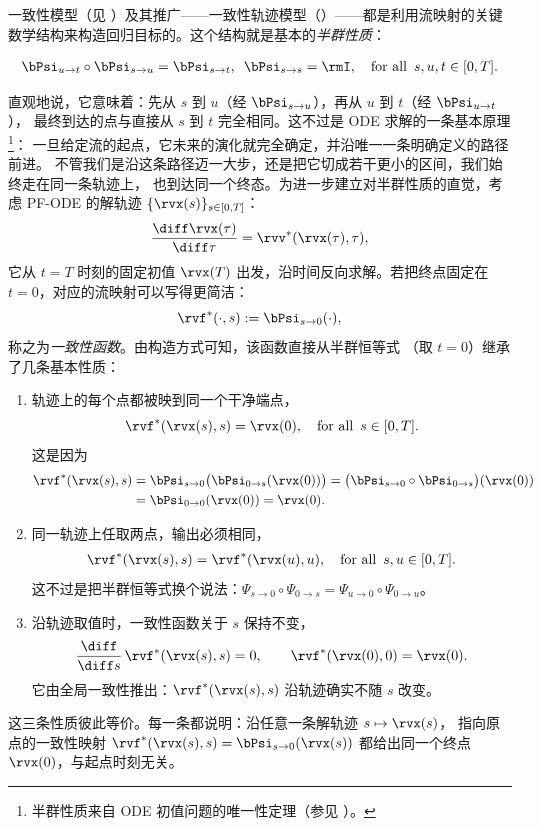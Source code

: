 一致性模型（见 ）及其推广——一致性轨迹模型（）——都是利用流映射的关键数学结构来构造回归目标的。这个结构就是基本的\emph{半群性质}：
\begin{mdframed}
   \begin{align}\label{eq:semi-group}
       \bPsi_{u\to t}\circ \bPsi_{s\to u}=\bPsi_{s\to t},
       \,\,\,
       \bPsi_{s\to s}=\rmI, \quad \text{for all }\, s, u, t \in [0,T].
   \end{align}
\end{mdframed}
直观地说，它意味着：先从 $s$ 到 $u$（经 $\bPsi_{s\rightarrow u}$），再从 $u$ 到 $t$（经 $\bPsi_{u\rightarrow t}$），
最终到达的点与直接从 $s$ 到 $t$ 完全相同。这不过是 ODE 求解的一条基本原理\footnote{半群性质来自 ODE 初值问题的唯一性定理（参见 ）。}：
一旦给定流的起点，它未来的演化就完全确定，并沿唯一一条明确定义的路径前进。
不管我们是沿这条路径迈一大步，还是把它切成若干更小的区间，我们始终走在同一条轨迹上，
也到达同一个终态。为进一步建立对半群性质的直觉，考虑 PF-ODE 的解轨迹 $\{\rvx(s)\}_{s \in [0,T]}$：
\begin{align*}
    \frac{\diff \rvx(\tau)}{\diff \tau} = \rvv^*(\rvx(\tau), \tau),
\end{align*}
它从 $t=T$ 时刻的固定初值 $\rvx(T)$ 出发，沿时间反向求解。若把终点固定在 $t=0$，对应的流映射可以写得更简洁：
\[
\rvf^*(\cdot, s) := \bPsi_{s\to 0}(\cdot),
\]
称之为\emph{一致性函数}。由构造方式可知，该函数直接从半群恒等式 （取 $t=0$）继承了几条基本性质：\begin{enumerate}
    \item[(i)]  轨迹上的每个点都被映到同一个干净端点，
    \[
       \rvf^*(\rvx(s), s) = \rvx(0), \quad \text{for all }\, s \in [0,T].
    \]
    这是因为
\begin{align*}
\rvf^*(\rvx(s),s)
&= \bPsi_{s\to 0}\big(\bPsi_{0\to s}(\rvx(0))\big)
= \big(\bPsi_{s\to 0}\circ \bPsi_{0\to s}\big)(\rvx(0))
\\&= \bPsi_{0\to 0}(\rvx(0))
= \rvx(0).
\end{align*}
    \item[(ii)]  同一轨迹上任取两点，输出必须相同，
    \begin{align}\label{eq:cm-self-consistency}
       \rvf^*(\rvx(s), s) = \rvf^*(\rvx(u), u), \quad \text{for all }\, s, u \in [0,T].
    \end{align}
    这不过是把半群恒等式换个说法：$\Psi_{s\rightarrow 0}\circ\Psi_{0\rightarrow s}=\Psi_{u\rightarrow 0}\circ\Psi_{0\rightarrow u}$。
    \item[(iii)]  沿轨迹取值时，一致性函数关于 $s$ 保持不变，
    \begin{align}\label{eq:cm-diff}
        \frac{\diff}{\diff s}\,\rvf^*(\rvx(s),s) = 0,
        \qquad \rvf^*(\rvx(0),0) = \rvx(0).
    \end{align}
它由全局一致性推出：$\rvf^*(\rvx(s), s)$ 沿轨迹确实不随 $s$ 改变。
\end{enumerate}
这三条性质彼此等价。每一条都说明：沿任意一条解轨迹 $s\mapsto \rvx(s)$，
指向原点的一致性映射 $\rvf^*(\rvx(s),s)=\bPsi_{s\to 0}(\rvx(s))$
都给出同一个终点 $\rvx(0)$，与起点时刻无关。


